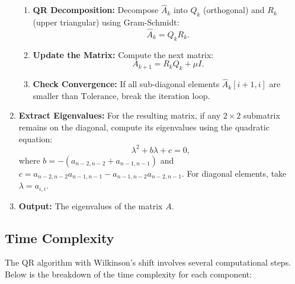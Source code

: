 \documentclass[journal]{IEEEtran}
\begin{document}
\begin{enumerate}
\begin{enumerate}
        \item \textbf{QR Decomposition:} Decompose $\hat{A}_k$ into $Q_k$ (orthogonal) and $R_k$ (upper triangular) using Gram-Schmidt:
        \[
        \hat{A}_k = Q_k R_k.
        \]

        \item \textbf{Update the Matrix:} Compute the next matrix:
        \[
        A_{k+1} = R_k Q_k + \mu I.
        \]

        \item \textbf{Check Convergence:} If all sub-diagonal elements $\hat{A}_k[i+1,i]$ are smaller than $\text{Tolerance}$, break the iteration loop.
    \end{enumerate}

    \item \textbf{Extract Eigenvalues:} 
    For the resulting matrix, if any $2 \times 2$ submatrix remains on the diagonal, compute its eigenvalues using the quadratic equation:
    \[
    \lambda^2 + b\lambda + c = 0,
    \]
    where $b = -(a_{n-2,n-2} + a_{n-1,n-1})$ and $c = a_{n-2,n-2} a_{n-1,n-1} - a_{n-1,n-2} a_{n-2,n-1}$. For diagonal elements, take $\lambda = a_{i,i}$.

    \item \textbf{Output:} The eigenvalues of the matrix $A$.
\end{enumerate}
\subsection{Time Complexity}
The QR algorithm with Wilkinson's shift involves several computational steps. Below is the breakdown of the time complexity for each component:
\end{document}

